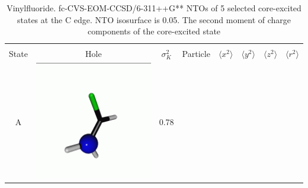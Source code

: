 \documentclass[journal=jctcce,manuscript=article]{achemso}
\begin{document}
 \begin{table}[H]
 \centering
 \caption{Vinylfluoride. fc-CVS-EOM-CCSD/6-311++G** 
 NTOs of 5 selected core-excited states at the C edge. 
 NTO isosurface is 0.05. The second moment of charge components of the core-excited state \label{vinylfluoride-ntos-Cedge}}
 \vspace{3em}
 \begin{tabular}{ c | c c c | c c c c}
     \hline
             & \multicolumn{3}{c}{} \\
     State &  Hole & $\sigma_K^2$ & Particle 
     & $\langle x^2 \rangle$ 
     & $\langle y^2 \rangle$
     & $\langle z^2 \rangle$
     & $\langle r^2 \rangle$\\
     \hline
     A &  
     \begin{minipage}{0.2\textwidth}
         \centering
         \includegraphics[scale=0.10]{NTO/CH2CHF/1h.png}
     \end{minipage}
     & 0.78
     &  \begin{minipage}{0.2\textwidth}
         \centering

\end{minipage}
\end{tabular}
\end{table}
\end{document}
